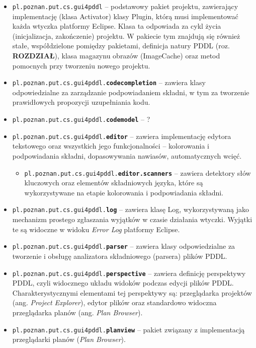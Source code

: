 \begin{itemize}
\item \texttt{pl.poznan.put.cs.gui4pddl} -- podstawowy pakiet projektu, zawierający implementację (klasa Activator) klasy Plugin, którą musi implementować każda wtyczka platformy Eclipse. Klasa ta odpowiada za cykl życia (inicjalizacja, zakończenie) projektu. W pakiecie tym znajdują się również stałe, współdzielone pomiędzy pakietami, definicja natury PDDL (roz. \textbf{ROZDZIAŁ}), klasa magazynu obrazów (ImageCache) oraz metod pomocnych przy tworzeniu nowego projektu.
\item \texttt{pl.poznan.put.cs.gui4pddl.\textbf{codecompletion}} -- zawiera klasy odpowiedzialne za zarządzanie podpowiadaniem składni, w tym za tworzenie prawidłowych propozycji uzupełniania kodu.
\item \texttt{pl.poznan.put.cs.gui4pddl.\textbf{codemodel}} -- ?
\item \texttt{pl.poznan.put.cs.gui4pddl.\textbf{editor}} -- zawiera implementację edytora tekstowego oraz wszystkich jego funkcjonalności -- kolorowania i podpowiadania składni, dopasowywania nawiasów, automatycznych wcięć.
\begin{itemize}
\item \texttt{pl.poznan.put.cs.gui4pddl.\textbf{editor.scanners}} -- zawiera detektory słów kluczowych oraz elementów składniowych języka, które są wykorzystywane na etapie kolorowania i podpowiadania składni.
\end{itemize}
\item \texttt{pl.poznan.put.cs.gui4pddl.\textbf{log}} -- zawiera klasę Log, wykorzystywaną jako mechanizm prostego zgłaszania wyjątków w czasie działania wtyczki. Wyjątki te są widoczne w widoku \textit{Error Log} platformy Eclipse.
\item \texttt{pl.poznan.put.cs.gui4pddl.\textbf{parser}} -- zawiera klasy odpowiedzialne za tworzenie i obsługę analizatora składniowego (parsera) plików PDDL.
\item \texttt{pl.poznan.put.cs.gui4pddl.\textbf{perspective}} -- zawiera definicję perspektywy PDDL, czyli widocznego układu widoków podczas edycji plików PDDL. Charakterystycznymi elementami tej perspektywy są: przeglądarka projektów (ang. \textit{Project Explorer}), edytor plików oraz standardowo widoczna przeglądarka planów (ang. \textit{Plan Browser}).
\item \texttt{pl.poznan.put.cs.gui4pddl.\textbf{planview}} -- pakiet związany z implementacją przeglądarki planów (\textit{Plan Browser}).
\begin{itemize}

\end{itemize}
\end{itemize}

